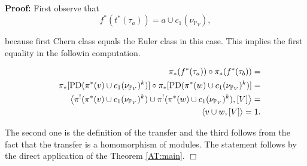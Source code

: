\documentclass[a4paper,14pt]{article}
\newcommand{\B}[1]{\mathbb #1}
\newcommand{\PD }{\hbox {\text {PD}}}
\newcommand{\pf}{\NI {\bf Proof: }}
\newcommand{\QED}{\hfill$\Box$\medskip}
\newcommand{\NI}{{\noindent}}
\numberwithin{equation}{section}
\begin{document}
\pf
First observe that
$$f^*(t^*(\tau  _{a })) = a \cup c_1(\nu _{\B P_V}),$$

\NI
because first Chern class equals the Euler class in this case.
This implies the first equality in the followin computation.

\begin{eqnarray*}
&&\pi _*(f^*(\tau _a)) \circ \pi _*(f^*(\tau _b))=\\
&&\pi _*[\PD (\pi ^*(v) \cup c_1(\nu _{\B P_V})^k)] \circ
  \pi _*[\PD (\pi ^*(w) \cup c_1(\nu _{\B P_V})^k)] = \\
&&\left <\pi ^! (\pi ^*(v) \cup c_1(\nu _{\B P_V})^k) \cup
  \pi ^! (\pi ^*(w) \cup c_1(\nu _{\B P_V})^k), [V]\right > = \\
&&\left < v \cup w , [V]\right >= 1.
\end{eqnarray*}

\NI
The second one is the definition of the transfer and
the third follows from the fact that the transfer is
a homomorphism of modules. The statement follows by
the direct application of the Theorem \ref{AT:main}.
\QED
\end{document}
